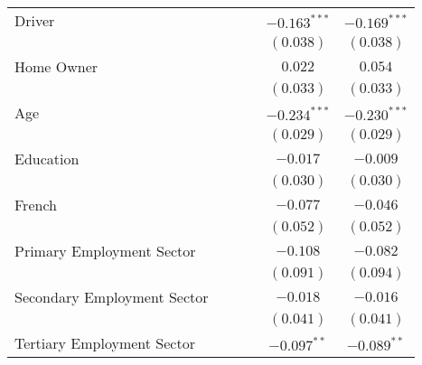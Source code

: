 \begin{center}
\begin{tiny}
\begin{longtable}{l@{} c@{} c@{} c@{} c@{} c@{}}
\quad Driver                                    &                &                  &                & $-0.163^{***}$   & $-0.169^{***}$ \\
                                                &                &                  &                & $(0.038)$        & $(0.038)$      \\
\quad Home Owner                                &                &                  &                & $0.022$          & $0.054$        \\
                                                &                &                  &                & $(0.033)$        & $(0.033)$      \\
\quad Age                                       &                &                  &                & $-0.234^{***}$   & $-0.230^{***}$ \\
                                                &                &                  &                & $(0.029)$        & $(0.029)$      \\
\quad Education                                 &                &                  &                & $-0.017$         & $-0.009$       \\
                                                &                &                  &                & $(0.030)$        & $(0.030)$      \\
\quad French                                    &                &                  &                & $-0.077$         & $-0.046$       \\
                                                &                &                  &                & $(0.052)$        & $(0.052)$      \\
\quad Primary Employment Sector                 &                &                  &                & $-0.108$         & $-0.082$       \\
                                                &                &                  &                & $(0.091)$        & $(0.094)$      \\
\quad Secondary Employment Sector               &                &                  &                & $-0.018$         & $-0.016$       \\
                                                &                &                  &                & $(0.041)$        & $(0.041)$      \\
\quad Tertiary Employment Sector                &                &                  &                & $-0.097^{**}$    & $-0.089^{**}$  \\

\end{longtable}
\end{tiny}
\end{center}

